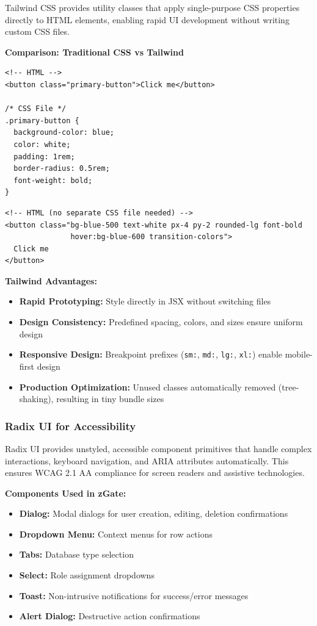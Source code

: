 Tailwind CSS provides utility classes that apply single-purpose CSS properties directly to HTML elements, enabling rapid UI development without writing custom CSS files.

\textbf{Comparison: Traditional CSS vs Tailwind}

\begin{lstlisting}[style=code, caption=Traditional CSS Approach]
<!-- HTML -->
<button class="primary-button">Click me</button>

/* CSS File */
.primary-button {
  background-color: blue;
  color: white;
  padding: 1rem;
  border-radius: 0.5rem;
  font-weight: bold;
}
\end{lstlisting}

\begin{lstlisting}[style=code, caption=Tailwind CSS Approach]
<!-- HTML (no separate CSS file needed) -->
<button class="bg-blue-500 text-white px-4 py-2 rounded-lg font-bold 
               hover:bg-blue-600 transition-colors">
  Click me
</button>
\end{lstlisting}

\textbf{Tailwind Advantages:}
\begin{itemize}
    \item \textbf{Rapid Prototyping:} Style directly in JSX without switching files
    \item \textbf{Design Consistency:} Predefined spacing, colors, and sizes ensure uniform design
    \item \textbf{Responsive Design:} Breakpoint prefixes (\texttt{sm:}, \texttt{md:}, \texttt{lg:}, \texttt{xl:}) enable mobile-first design
    \item \textbf{Production Optimization:} Unused classes automatically removed (tree-shaking), resulting in tiny bundle sizes
\end{itemize}

\subsubsection{Radix UI for Accessibility}

Radix UI provides unstyled, accessible component primitives that handle complex interactions, keyboard navigation, and ARIA attributes automatically. This ensures WCAG 2.1 AA compliance for screen readers and assistive technologies.

\textbf{Components Used in zGate:}
\begin{itemize}
    \item \textbf{Dialog:} Modal dialogs for user creation, editing, deletion confirmations
    \item \textbf{Dropdown Menu:} Context menus for row actions
    \item \textbf{Tabs:} Database type selection
    \item \textbf{Select:} Role assignment dropdowns
    \item \textbf{Toast:} Non-intrusive notifications for success/error messages
    \item \textbf{Alert Dialog:} Destructive action confirmations
\end{itemize}

